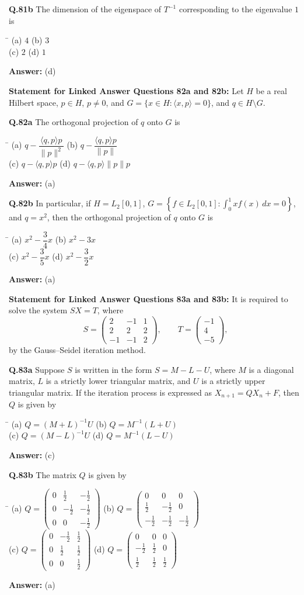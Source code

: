 \documentclass[11pt,a4paper]{article}
\newcommand{\optsfour}[4]{%
  \begin{tabbing}
    \hspace{0.48\linewidth}\=\kill
    (a) #1 \> (b) #2 \\[2pt]
    (c) #3 \> (d) #4
  \end{tabbing}%
}
\newcommand{\ans}[1]{\textbf{Answer:} #1\par\medskip}
\begin{document}
\textbf{Q.81b} The dimension of the eigenspace of $T^{-1}$ corresponding to the eigenvalue $1$ is
\optsfour{$4$}{$3$}{$2$}{$1$}
\ans{(d)}

\medskip
\textbf{Statement for Linked Answer Questions 82a and 82b:}
Let $H$ be a real Hilbert space, $p \in H$, $p \ne 0$, and $G = \{x \in H : \langle x, p \rangle = 0\}$, and $q \in H \setminus G$.

\textbf{Q.82a} The orthogonal projection of $q$ onto $G$ is
\optsfour{$q - \dfrac{\langle q, p \rangle p}{\|p\|^2}$}{$q - \dfrac{\langle q, p \rangle p}{\|p\|}$}{$q - \langle q, p \rangle p$}{$q - \langle q, p \rangle \|p\| p$}
\ans{(a)}

\textbf{Q.82b} In particular, if $H = L_2[0,1]$, $G = \left\{f \in L_2[0,1] : \displaystyle\int_0^1 x f(x)\,dx = 0\right\}$, and $q = x^2$, then the orthogonal projection of $q$ onto $G$ is
\optsfour{$x^2 - \dfrac{3}{4}x$}{$x^2 - 3x$}{$x^2 - \dfrac{3}{5}x$}{$x^2 - \dfrac{3}{2}x$}
\ans{(a)}

\medskip
\textbf{Statement for Linked Answer Questions 83a and 83b:}
It is required to solve the system $SX = T$, where
\[
  S = \begin{pmatrix} 2 & -1 & 1 \\ 2 & 2 & 2 \\ -1 & -1 & 2 \end{pmatrix}, \qquad T = \begin{pmatrix} -1 \\ 4 \\ -5 \end{pmatrix},
\]
by the Gauss--Seidel iteration method.

\textbf{Q.83a} Suppose $S$ is written in the form $S = M - L - U$, where $M$ is a diagonal matrix, $L$ is a strictly lower triangular matrix, and $U$ is a strictly upper triangular matrix. If the iteration process is expressed as $X_{n+1} = Q X_n + F$, then $Q$ is given by
\optsfour{$Q = (M + L)^{-1}U$}{$Q = M^{-1}(L + U)$}{$Q = (M - L)^{-1}U$}{$Q = M^{-1}(L - U)$}
\ans{(c)}

\textbf{Q.83b} The matrix $Q$ is given by
\optsfour{$Q = \begin{pmatrix} 0 & \frac{1}{2} & -\frac{1}{2} \\ 0 & -\frac{1}{2} & -\frac{1}{2} \\ 0 & 0 & -\frac{1}{2} \end{pmatrix}$}{$Q = \begin{pmatrix} 0 & 0 & 0 \\ \frac{1}{2} & -\frac{1}{2} & 0 \\ -\frac{1}{2} & -\frac{1}{2} & -\frac{1}{2} \end{pmatrix}$}{$Q = \begin{pmatrix} 0 & -\frac{1}{2} & \frac{1}{2} \\ 0 & \frac{1}{2} & \frac{1}{2} \\ 0 & 0 & \frac{1}{2} \end{pmatrix}$}{$Q = \begin{pmatrix} 0 & 0 & 0 \\ -\frac{1}{2} & \frac{1}{2} & 0 \\ \frac{1}{2} & \frac{1}{2} & \frac{1}{2} \end{pmatrix}$}
\ans{(a)}
\end{document}
